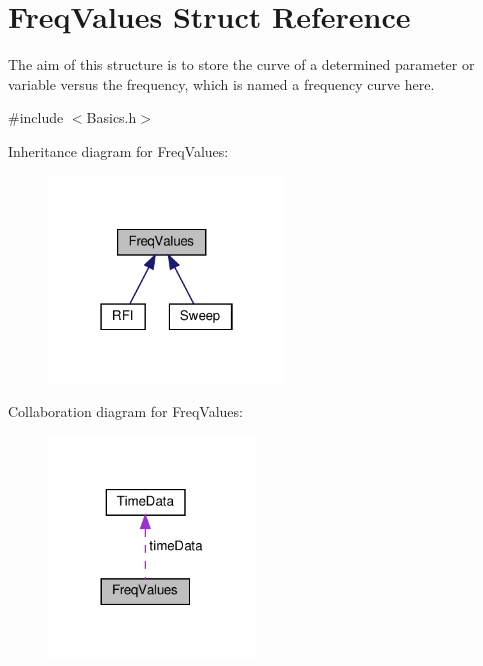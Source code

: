 \hypertarget{structFreqValues}{}\section{Freq\+Values Struct Reference}
\label{structFreqValues}


The aim of this structure is to store the curve of a determined parameter or variable versus the frequency, which is named a frequency curve here.  




{\ttfamily \#include $<$Basics.\+h$>$}



Inheritance diagram for Freq\+Values\+:
\nopagebreak
\begin{figure}[H]
\begin{center}
\leavevmode
\includegraphics[width=178pt]{structFreqValues__inherit__graph}
\end{center}
\end{figure}


Collaboration diagram for Freq\+Values\+:
\nopagebreak
\begin{figure}[H]
\begin{center}
\leavevmode
\includegraphics[width=156pt]{structFreqValues__coll__graph}
\end{center}
\end{figure}

